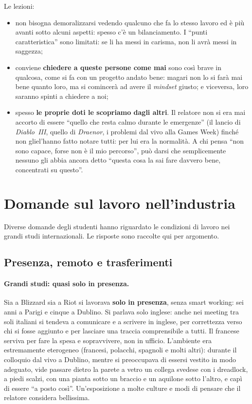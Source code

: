 Le lezioni:
\begin{itemize}
  \item non bisogna demoralizzarsi vedendo qualcuno che fa lo stesso lavoro
        ed è più avanti sotto alcuni aspetti: spesso c'è un bilanciamento. I
        ``punti caratteristica'' sono limitati: se li ha messi in carisma,
        non li avrà messi in saggezza;
  \item conviene \textbf{chiedere a queste persone come mai} sono così brave
        in qualcosa, come si fa con un progetto andato bene: magari non lo si
        farà mai bene quanto loro, ma si comincerà ad avere il
        \emph{mindset} giusto; e viceversa, loro saranno spinti a chiedere a
        noi;
  \item spesso \textbf{le proprie doti le scopriamo dagli altri}. Il relatore
        non si era mai accorto di essere ``quello che resta calmo durante le
        emergenze'' (il lancio di \emph{Diablo~III}, quello di
        \emph{Draenor}, i problemi dal vivo alla Games Week) finché non
        gliel'hanno fatto notare tutti: per lui era la normalità. A chi pensa
        ``non sono capace, forse non è il mio percorso'', può darsi che
        semplicemente nessuno gli abbia ancora detto ``questa cosa la sai
        fare davvero bene, concentrati su questo''.
\end{itemize}

\section{Domande sul lavoro nell'industria}
\label{sec:z1-industria}

Diverse domande degli studenti hanno riguardato le condizioni di lavoro nei
grandi studi internazionali. Le risposte sono raccolte qui per argomento.

\subsection{Presenza, remoto e trasferimenti}

\paragraph{Grandi studi: quasi solo in presenza.} Sia a Blizzard sia a Riot si
lavorava \textbf{solo in presenza}, senza smart working: sei anni a Parigi e
cinque a Dublino. Si parlava solo inglese: anche nei meeting tra soli
italiani si tendeva a comunicare e a scrivere in inglese, per correttezza
verso chi si fosse aggiunto e per lasciare una traccia comprensibile a tutti.
Il francese serviva per fare la spesa e sopravvivere, non in ufficio.
L'ambiente era estremamente eterogeneo (francesi, polacchi, spagnoli e
molti altri): durante il colloquio dal vivo a Dublino, mentre si preoccupava
di essersi vestito in modo adeguato, vide passare dietro la parete a vetro un
collega svedese con i dreadlock, a piedi scalzi, con una pianta sotto un
braccio e un aquilone sotto l'altro, e capì di essere ``a posto così''.
Un'esposizione a molte culture e modi di pensare che il relatore considera
bellissima.

